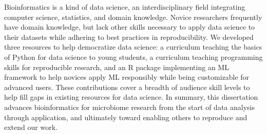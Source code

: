 Bioinformatics is a kind of data science, an interdisciplinary field integrating
computer science, statistics, and domain knowledge.
Novice researchers frequently have domain knowledge, but lack other skills
necessary to apply data science to their datasets while adhering to best
practices in reproducibility.
We developed three resources to help democratize data science:
a curriculum teaching the basics of Python for data science to young students,
a curriculum teaching programming skills for reproducible research,
and an R package implementing an ML framework to help novices apply ML
responsibly while being customizable for advanced users.
These contributions cover a breadth of audience skill levels to help fill gaps
in existing resources for data science.
In summary, this dissertation advances bioinformatics for microbiome research
from the start of data analysis through application,
and ultimately toward enabling others to reproduce and extend our work.
